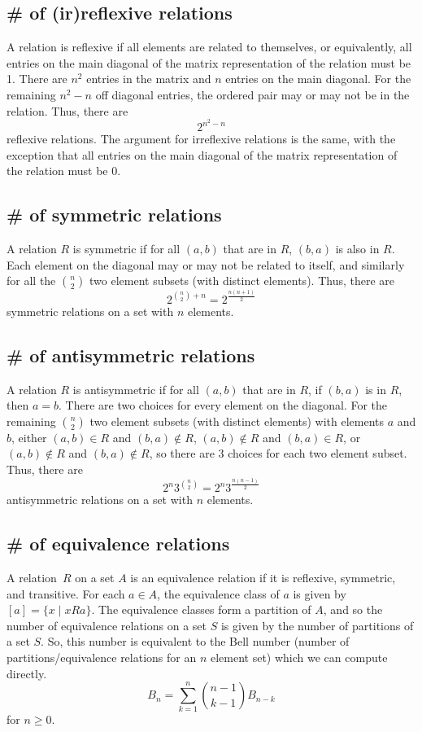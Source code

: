 \documentclass{article}
\begin{document}
\subsection{\# of (ir)reflexive relations}
A relation is reflexive if all elements are related to themselves, or equivalently, all entries on the main diagonal of the matrix representation of the relation must be 1. There are $n^2$ entries in the matrix and $n$ entries on the main diagonal. For the remaining $n^2-n$ off diagonal entries, the ordered pair may or may not be in the relation. Thus, there are
\[2^{n^2-n}\]
reflexive relations. The argument for irreflexive relations is the same, with the exception that all entries on the main diagonal of the matrix representation of the relation must be 0.
\subsection{\# of symmetric relations}
A relation $R$ is symmetric if for all $(a,b)$ that are in $R$, $(b,a)$ is also in $R$. Each element on the diagonal may or may not be related to itself, and similarly for all the ${n \choose 2}$ two element subsets (with distinct elements). Thus, there are
\[2^{{n \choose 2} + n} = 2^{\frac{n(n+1)}{2}}\]
symmetric relations on a set with $n$ elements.
\subsection{\# of antisymmetric relations}
A relation $R$ is antisymmetric if for all $(a,b)$ that are in $R$, if $(b,a)$ is in $R$, then $a=b$. There are two choices for every element on the diagonal. For the remaining ${n \choose 2}$ two element subsets (with distinct elements) with elements $a$ and $b$, either $(a,b) \in R$ and $(b,a) \not \in R$, $(a,b) \not \in R$ and $(b,a) \in R$, or $(a,b) \not \in R$ and $(b,a) \not \in R$, so there are 3 choices for each two element subset. Thus, there are
\[2^n3^{{n \choose 2}} = 2^n3^{\frac{n(n-1)}{2}}\]
antisymmetric relations on a set with $n$ elements.
\subsection{\# of equivalence relations}
A relation $R$ on a set $A$ is an equivalence relation if it is reflexive, symmetric, and transitive. For each $a \in A$, the equivalence class of $a$ is given by $[a] = \{x \mid xRa\}$. The equivalence classes form a partition of $A$, and so the number of equivalence relations on a set $S$ is given by the number of partitions of a set $S$. So, this number is equivalent to the Bell number (number of partitions/equivalence relations for an $n$ element set) which we can compute directly.
\[B_n = \sum_{k=1}^{n} {n-1 \choose k-1} B_{n-k}\]
for $n \ge 0$.
\end{document}
